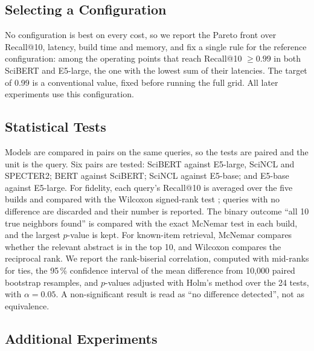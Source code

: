 \documentclass[runningheads]{llncs}
\begin{document}
\subsection{Selecting a Configuration}

No configuration is best on every cost, so we report the Pareto front over Recall@10,
latency, build time and memory, and fix a single rule for the reference configuration: among
the operating points that reach Recall@10 $\geq 0.99$ in both SciBERT and E5-large, the one
with the lowest sum of their latencies. The target of 0.99 is a conventional value, fixed before running the full grid.
All later experiments use this configuration.

\subsection{Statistical Tests}

Models are compared in pairs on the same queries, so the tests are paired and the unit is
the query. Six pairs are tested: SciBERT against E5-large, SciNCL and SPECTER2; BERT
against SciBERT; SciNCL against E5-base; and E5-base against E5-large.
For fidelity, each query's Recall@10 is averaged over the five builds and compared with the
Wilcoxon signed-rank test \cite{wilcoxon1945}; queries with no difference are discarded and
their number is reported. The binary outcome ``all 10 true neighbors found'' is compared with
the exact McNemar test \cite{mcnemar1947} in each build, and the largest $p$-value is kept. For
known-item retrieval, McNemar compares whether the relevant abstract is in the top 10, and
Wilcoxon compares the reciprocal rank. We report the rank-biserial correlation, computed with
mid-ranks for ties, the 95\,\% confidence interval of the mean difference from 10,000 paired
bootstrap resamples, and $p$-values adjusted with Holm's method \cite{holm1979} over the 24
tests, with $\alpha=0.05$. A non-significant result is read as ``no difference detected'', not
as equivalence.

\subsection{Additional Experiments}
\end{document}
